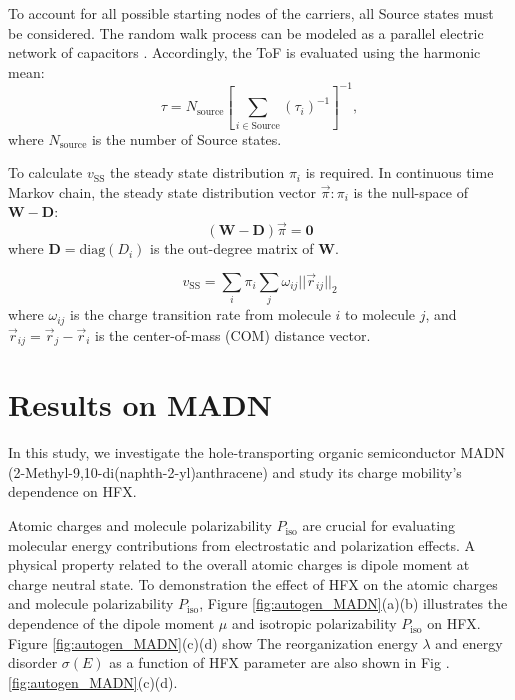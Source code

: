 \documentclass[letterpaper,12pt]{article}
\begin{document}
To account for all possible starting nodes of the carriers, all Source states must be considered. The random walk process can be modeled as a parallel electric network of capacitors \cite{doyle_random_2000}. Accordingly, the ToF is evaluated using the harmonic mean:
\begin{equation} 
\tau = N_\text{source} \left[\sum_{i \in \text{Source}} (\tau_i)^{-1}\right]^{-1},
\label{eq:ToF}
\end{equation}
where $N_\text{source}$ is the number of Source states.

To calculate $v_\text{SS}$ the steady state distribution $\pi_i$ is required. In continuous time Markov chain, the steady state distribution vector $\vec{\pi}: \pi_i$ is the null-space of $\mathbf{W}-\mathbf{D}$:
\begin{equation}
    (\mathbf{W}-\mathbf{D} )\vec{\pi} = \mathbf{0}
\end{equation}
where $\mathbf{D} = \text{diag}(D_i)$ is the out-degree matrix of $\mathbf{W}$.

\begin{equation}
    v_\text{SS} = \sum_i \pi_i \sum_j \omega_{ij} || \vec{r}_{ij}||_2
\end{equation} 
where $\omega_{ij}$ is the charge transition rate from molecule $i$ to molecule $j$, and $\vec{r}_{ij}=\vec{r}_j - \vec{r}_i$ is the center-of-mass (COM) distance vector. 

\section{Results on MADN}

In this study, we investigate the hole-transporting organic semiconductor MADN (2-Methyl-9,10-di(naphth-2-yl)anthracene) and study its charge mobility's dependence on HFX. 

Atomic charges and molecule polarizability $P_\text{iso}$ are crucial for evaluating molecular energy contributions from electrostatic and polarization effects. A physical property related to the overall atomic charges is dipole moment at charge neutral state. 
To demonstration the effect of HFX on the atomic charges and molecule polarizability $P_\text{iso}$,
Figure \ref{fig:autogen_MADN}(a)(b) illustrates the dependence of the dipole moment $\mu$ and isotropic polarizability $P_\text{iso}$ on HFX.
Figure \ref{fig:autogen_MADN}(c)(d) show 
The reorganization energy $\lambda$ and energy disorder $\sigma(E)$ as a function of HFX parameter are also shown in Fig .\ref{fig:autogen_MADN}(c)(d).
\end{document}
